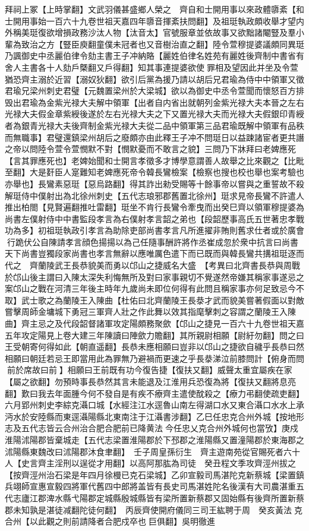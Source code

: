 拜祠上冢【上時掌翻】文武羽儀甚盛鄉人榮之　齊自和士開用事以來政體隳紊【和士開用事始一百六十九卷世祖天嘉四年隳音揮紊扶問翻】及祖珽執政頗收舉才望内外稱美珽復欲增損政務沙汰人物【汰音太】官號服章並依故事又欲黜諸閹豎及羣小輩為致治之方【豎臣庾翻童僕未冠者也又音樹治直之翻】陸令萱穆提婆議頗同異珽乃諷御史中丞麗伯律令劾主書王子冲納賂【麗姓伯律名姓苑有麗姓後齊制中書省有舍人主書各十人劾戶槩翻又戶得翻】知其事連提婆欲使罪相及望因此并坐及令萱猶恐齊主溺於近習【溺奴狄翻】欲引后黨為援乃請以胡后兄君瑜為侍中中領軍又徵君瑜兄梁州刺史君璧【元魏置梁州於大梁城】欲以為御史中丞令萱聞而懷怒百方排毁出君瑜為金紫光禄大夫解中領軍【出者自内省出就朝列金紫光禄大夫本晉之左右光禄大夫假金章紫綬後遂於左右光禄大夫之下又置光禄大夫而光禄大夫假銀印青綬者為銀青光禄大夫後齊制金紫光禄大夫從二品中領軍第三品君瑜既解中領軍有品秩而無職事】君璧還鎮梁州胡后之廢頗亦由此釋王子冲不問珽日以益踈諸宦者更共譖之帝以問陸令萱令萱憫默不對【憫默憂而不敢言之貌】三問乃下牀拜曰老婢應死【言其罪應死也】老婢始聞和士開言孝徵多才博學意謂善人故舉之比來觀之【比毗至翻】大是姧臣人寔難知老婢應死帝令韓長鸞檢案【檢察也搜也校也舉也案考驗也亦舉也】長鸞素惡珽【惡烏路翻】得其詐出勑受賜等十餘事帝以嘗與之重誓故不殺解珽侍中僕射出為北徐州刺史【五代志琅邪郡舊置北徐州】珽求見帝長鸞不許遣人推出柏閤【見賢遍翻推吐雷翻】珽坐不肯行長鸞令牽曳而出癸巳齊以領軍穆提婆為尚書左僕射侍中中書監段孝言為右僕射孝言韶之弟也【段韶歷事高氏五世著忠孝戰功為多】初祖珽執政引孝言為助除吏部尚書孝言凡所進擢非賄則舊求仕者或於廣會行跪伏公自陳請孝言顔色揚揚以為己任隨事酬許將作丞崔成忽於衆中抗言曰尚書天下尚書豈獨段家尚書也孝言無辭以應唯厲色遣下而已既而與韓長鸞共搆祖珽逐而代之　齊蘭陵武王長恭貌美而勇以邙山之捷威名大盛　【考異曰北齊書長恭與周戰於邙山後主謂曰入陳太深失利悔無所及對曰家事親切不覺遂然帝嫌其稱家事遂忌之案邙山之戰在河清三年後主時年九歲尚未即位何得有此問且稱家事亦何足致忌今不取】武士歌之為蘭陵王入陳曲【杜佑曰北齊蘭陵王長㳟才武而貌美嘗著假面以對敵嘗擊周師金墉城下勇冠三軍齊人壯之作此舞以效其指麾擊刺之容謂之蘭陵王入陳曲】齊主忌之及代段韶督諸軍攻定陽頗務聚歛【邙山之捷見一百六十九卷世祖天嘉五年攻定陽見上卷大建三年陳讀曰陣歛力贍翻】其所親尉相願【尉紆勿翻】問之曰王受朝寄何得如此【朝直遥翻】長恭未應相願曰豈非以邙山之捷欲自穢乎長恭曰然相願曰朝廷若忌王即當用此為罪無乃避禍而更速之乎長㳟涕泣前膝問計【俯身而問前於席故曰前】相願曰王前既有功今復告捷【復扶又翻】威聲太重宜屬疾在家【屬之欲翻】勿預時事長恭然其言未能退及江淮用兵恐復為將【復扶又翻將息亮翻】歎曰我去年面腫今何不發自是有疾不療齊主遣使酖殺之【療力弔翻使疏吏翻】　六月郢州刺史李綜克灄口城【水經注江水逕魯山南左得湖口水又東合灄口水水上承沔水於安陸縣而東逕灄陽縣北東南注于江灄書涉翻】乙巳任忠克合州外城【按地形志及五代志皆云合州治合肥合肥前已降黄法今任忠乂克合州外城何也當攷】庚戍淮陽沭陽郡皆棄城走【五代志梁置淮陽郡於下邳郡之淮陽縣又置潼陽郡於東海郡之沭陽縣東魏改曰沭陽郡沐食聿翻】　壬子周皇孫衍生　齊主遊南苑從官賜死者六十人【史言齊主淫刑以逞從才用翻】以高阿那肱為司徒　癸丑程文季攻齊涇州拔之【按齊涇州治石梁是年四月徐槾已克石梁城】乙卯宣毅司馬湛陀克新蔡城【梁置鎮兵翊師宣惠宣毅四將軍代舊四中郎將盖皆有長史司馬湛姓陀名後漢有大司農湛重五代志廬江郡渒水縣弋陽郡定城縣殷城縣皆有梁所置新蔡郡又固始縣有後齊所置新蔡郡未知孰是湛徒减翻陀徒何翻】　丙辰齊使開府儀同三司王紘聘于周　癸亥黃法克合州【以此觀之則前請降者合肥戍卒也巨俱翻】吳明徹進